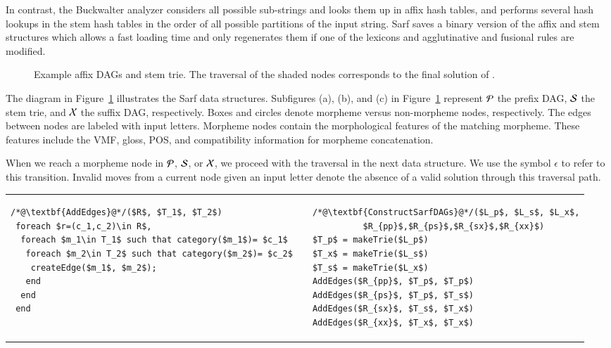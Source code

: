 In contrast, the Buckwalter analyzer considers all possible sub-strings and looks 
them up in affix hash tables, 
and performs several hash lookups in the stem hash tables in the order of all 
possible partitions of the input string. 
Sarf saves a binary version of the affix and stem structures which allows a 
fast loading time and 
only regenerates them if one of the lexicons 
and agglutinative and fusional rules are modified.

\transfalse
\begin{figure}
\centering
\resizebox{.8\textwidth}{!}{ 
 
}
\caption{Example affix DAGs and stem trie. 
The traversal of the shaded nodes corresponds to the final solution of .}
\label{f:example}
\end{figure}
\transtrue

The diagram in Figure~\ref{f:example}
illustrates the Sarf data structures. 
Subfigures (a), (b), and (c) in Figure~\ref{f:example}
represent ${\cal P}$ the prefix DAG,
${\cal S}$ the stem trie, and ${\cal X}$ the suffix
DAG, respectively. 
Boxes and circles denote morpheme versus non-morpheme nodes, 
respectively. 
The edges between nodes are labeled with input letters. 
Morpheme nodes contain the morphological features of the matching morpheme.
These features include the VMF, gloss, POS, and compatibility 
information for morpheme concatenation.

When we reach a morpheme node in ${\cal P}$, ${\cal S}$, 
or ${\cal X}$, we proceed with the traversal in the next data structure. 
We use the symbol $\epsilon$ to refer to this transition. 
Invalid moves from a current node given an input letter denote 
the absence of a valid solution through this traversal path.

\begin{lrbox}{0}
  \begin{tabular}{p{2.7in}p{0.02in}p{1.9in}}
\begin{lstlisting}
/*@\textbf{AddEdges}@*/($R$, $T_1$, $T_2$)
 foreach $r=(c_1,c_2)\in R$,
  foreach $m_1\in T_1$ such that category($m_1$)= $c_1$
   foreach $m_2\in T_2$ such that category($m_2$)= $c_2$
    createEdge($m_1$, $m_2$);
   end
  end
 end
\end{lstlisting}
& & 
\begin{lstlisting}
/*@\textbf{ConstructSarfDAGs}@*/($L_p$, $L_s$, $L_x$,
          $R_{pp}$,$R_{ps}$,$R_{sx}$,$R_{xx}$)
$T_p$ = makeTrie($L_p$)
$T_x$ = makeTrie($L_s$)
$T_s$ = makeTrie($L_x$)
AddEdges($R_{pp}$, $T_p$, $T_p$)
AddEdges($R_{ps}$, $T_p$, $T_s$)
AddEdges($R_{sx}$, $T_s$, $T_x$)
AddEdges($R_{xx}$, $T_x$, $T_x$)
\end{lstlisting}
\end{tabular}
\end{lrbox}


